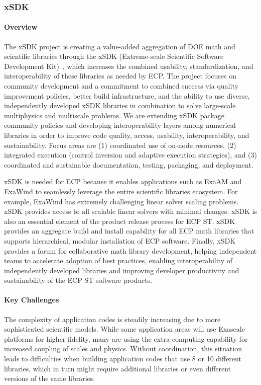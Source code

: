\subsubsection{ xSDK} 
\paragraph{Overview} The xSDK project is creating a value-added aggregation of DOE math and scientific libraries through the xSDK (Extreme-scale Scientific Software Development Kit)~\cite{xsdk:homepage}, which increases the combined usability, standardization, and interoperability of these libraries as needed by ECP. The project focuses on community development and a commitment to combined success via quality improvement policies, better build infrastructure, and the ability to use diverse, independently developed xSDK libraries in combination to solve large-scale multiphysics and multiscale problems.  We are extending xSDK package community policies and developing interoperability layers among numerical libraries in order to improve code quality, access, usability, interoperability, and sustainability. Focus areas are (1) coordinated use of on-node resources, (2) integrated execution (control inversion and adaptive execution strategies), and (3) coordinated and sustainable documentation, testing, packaging, and deployment. %

xSDK is needed for ECP because it enables applications such as ExaAM and ExaWind to seamlessly leverage the entire scientific libraries ecosystem.  For example, ExaWind has extremely challenging linear solver scaling problems.  xSDK provides access to all scalable linear solvers with minimal changes.  xSDK is also an essential element of the product release process for ECP ST.  xSDK provides an aggregate build and install capability for all ECP math libraries that supports hierarchical, modular installation of ECP software.  Finally, xSDK provides a forum for collaborative math library development, helping independent teams to accelerate adoption of best practices, enabling interoperability of independently developed libraries and improving developer productivity and sustainability of the ECP ST software products.

\paragraph{Key Challenges}
The complexity of application codes is steadily increasing due to more sophisticated scientific models.  While some application areas will use Exascale platforms for higher fidelity, many are using the extra computing capability for increased coupling of scales and physics.  Without coordination, this situation  leads to difficulties when building application codes that use 8 or 10 different libraries, which in turn might require additional libraries or even different versions of the same libraries.

